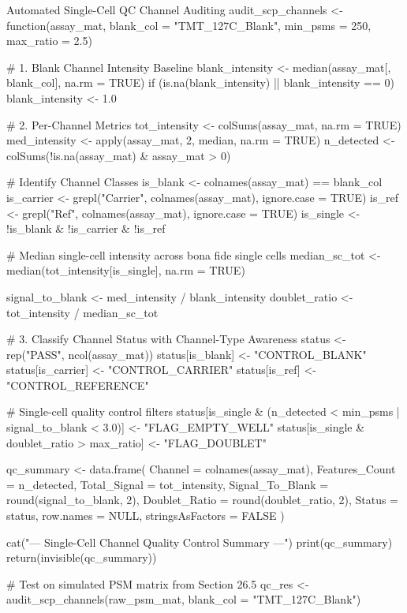 \documentclass[11pt,twoside,openright]{book}
\begin{document}
\begin{rchunk}{Automated Single-Cell QC Channel Auditing}
audit_scp_channels <- function(assay_mat, blank_col = "TMT_127C_Blank",
                               min_psms = 250, max_ratio = 2.5) {
  # 1. Blank Channel Intensity Baseline
  blank_intensity <- median(assay_mat[, blank_col], na.rm = TRUE)
  if (is.na(blank_intensity) || blank_intensity == 0) blank_intensity <- 1.0
  
  # 2. Per-Channel Metrics
  tot_intensity <- colSums(assay_mat, na.rm = TRUE)
  med_intensity <- apply(assay_mat, 2, median, na.rm = TRUE)
  n_detected    <- colSums(!is.na(assay_mat) & assay_mat > 0)
  
  # Identify Channel Classes
  is_blank   <- colnames(assay_mat) == blank_col
  is_carrier <- grepl("Carrier", colnames(assay_mat), ignore.case = TRUE)
  is_ref     <- grepl("Ref", colnames(assay_mat), ignore.case = TRUE)
  is_single  <- !is_blank & !is_carrier & !is_ref
  
  # Median single-cell intensity across bona fide single cells
  median_sc_tot <- median(tot_intensity[is_single], na.rm = TRUE)
  
  signal_to_blank <- med_intensity / blank_intensity
  doublet_ratio   <- tot_intensity / median_sc_tot
  
  # 3. Classify Channel Status with Channel-Type Awareness
  status <- rep("PASS", ncol(assay_mat))
  status[is_blank]   <- "CONTROL_BLANK"
  status[is_carrier] <- "CONTROL_CARRIER"
  status[is_ref]     <- "CONTROL_REFERENCE"
  
  # Single-cell quality control filters
  status[is_single & (n_detected < min_psms | signal_to_blank < 3.0)] <- "FLAG_EMPTY_WELL"
  status[is_single & doublet_ratio > max_ratio] <- "FLAG_DOUBLET"
  
  qc_summary <- data.frame(
    Channel         = colnames(assay_mat),
    Features_Count  = n_detected,
    Total_Signal    = tot_intensity,
    Signal_To_Blank = round(signal_to_blank, 2),
    Doublet_Ratio   = round(doublet_ratio, 2),
    Status          = status,
    row.names       = NULL,
    stringsAsFactors = FALSE
  )
  
  cat("--- Single-Cell Channel Quality Control Summary ---\n")
  print(qc_summary)
  return(invisible(qc_summary))
}

# Test on simulated PSM matrix from Section 26.5
qc_res <- audit_scp_channels(raw_psm_mat, blank_col = "TMT_127C_Blank")
\end{rchunk}
\end{document}
